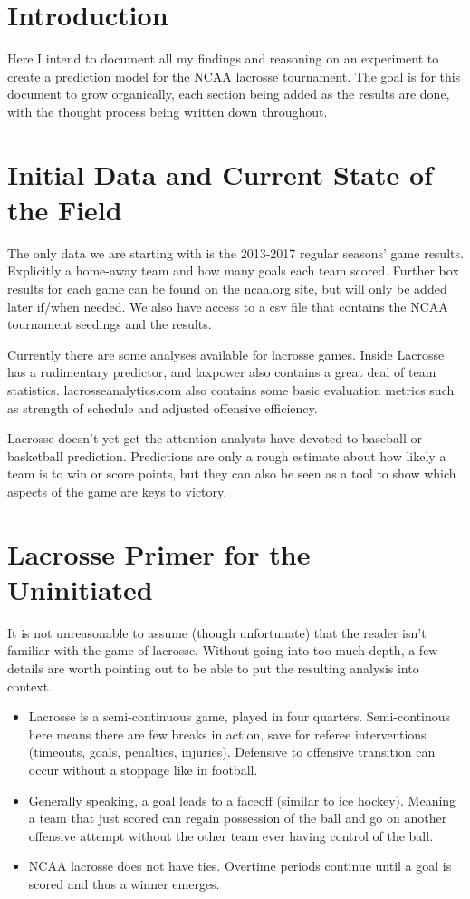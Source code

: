 \documentclass[11pt,a4paper]{article}
\begin{document}
\section*{Introduction}
Here I intend to document all my findings and reasoning on an experiment to create a prediction model for the NCAA lacrosse tournament. The goal is for this document to grow organically, each section being added as the results are done, with the thought process being written down throughout. 

\section*{Initial Data and Current State of the Field}
The only data we are starting with is the 2013-2017 regular seasons' game results. Explicitly a home-away team and how many goals each team scored. Further box results for each game can be found on the ncaa.org site, but will only be added later if/when needed. We also have access to a csv file that contains the NCAA tournament seedings and the results. 

Currently there are some analyses available for lacrosse games. Inside Lacrosse has a rudimentary predictor, and laxpower also contains a great deal of team statistics. lacrosseanalytics.com also contains some basic evaluation metrics such as strength of schedule and adjusted offensive efficiency. 

Lacrosse doesn't yet get the attention analysts have devoted to baseball or basketball prediction. Predictions are only a rough estimate about how likely a team is to win or score points, but they can also be seen as a tool to show which aspects of the game are keys to victory. 

\section*{Lacrosse Primer for the Uninitiated}
It is not unreasonable to assume (though unfortunate) that the reader isn't familiar with the game of lacrosse. Without going into too much depth, a few details are worth pointing out to be able to put the resulting analysis into context. 

\begin{itemize}
	\item Lacrosse is a semi-continuous game, played in four quarters. Semi-continous here means there are few breaks in action, save for referee interventions (timeouts, goals, penalties, injuries). Defensive to offensive transition can occur without a stoppage like in football. 
	\item Generally speaking, a goal leads to a faceoff (similar to ice hockey). Meaning a team that just scored can regain possession of the ball and go on another offensive attempt without the other team ever having control of the ball.
	\item NCAA lacrosse does not have ties. Overtime periods continue until a goal is scored and thus a winner emerges.
\end{itemize}
\end{document}
